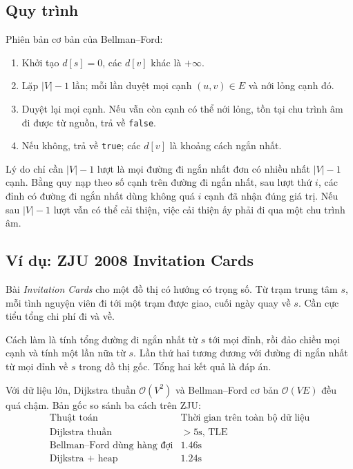 \documentclass[11pt]{article}
\newcommand{\Oh}{\mathcal{O}}
\begin{document}
\subsection{Quy trình}

Phiên bản cơ bản của Bellman--Ford:
\begin{enumerate}
  \item Khởi tạo \(d[s]=0\), các \(d[v]\) khác là \(+\infty\).
  \item Lặp \(|V|-1\) lần; mỗi lần duyệt mọi cạnh \((u,v)\in E\) và nới lỏng
  cạnh đó.
  \item Duyệt lại mọi cạnh. Nếu vẫn còn cạnh có thể nới lỏng, tồn tại chu
  trình âm đi được từ nguồn, trả về \texttt{false}.
  \item Nếu không, trả về \texttt{true}; các \(d[v]\) là khoảng cách ngắn nhất.
\end{enumerate}

Lý do chỉ cần \(|V|-1\) lượt là mọi đường đi ngắn nhất đơn có nhiều nhất
\(|V|-1\) cạnh. Bằng quy nạp theo số cạnh trên đường đi ngắn nhất, sau lượt
thứ \(i\), các đỉnh có đường đi ngắn nhất dùng không quá \(i\) cạnh đã nhận
đúng giá trị. Nếu sau \(|V|-1\) lượt vẫn có thể cải thiện, việc cải thiện ấy
phải đi qua một chu trình âm.

\subsection{Ví dụ: ZJU 2008 Invitation Cards}

Bài \textit{Invitation Cards} cho một đồ thị có hướng có trọng số. Từ trạm
trung tâm \(s\), mỗi tình nguyện viên đi tới một trạm được giao, cuối ngày
quay về \(s\). Cần cực tiểu tổng chi phí đi và về.

Cách làm là tính tổng đường đi ngắn nhất từ \(s\) tới mọi đỉnh, rồi đảo chiều
mọi cạnh và tính một lần nữa từ \(s\). Lần thứ hai tương đương với đường đi
ngắn nhất từ mọi đỉnh về \(s\) trong đồ thị gốc. Tổng hai kết quả là đáp án.

Với dữ liệu lớn, Dijkstra thuần \(\Oh(V^2)\) và Bellman--Ford cơ bản
\(\Oh(VE)\) đều quá chậm. Bản gốc so sánh ba cách trên ZJU:
\[
\begin{array}{lr}
\text{Thuật toán} & \text{Thời gian trên toàn bộ dữ liệu}\\
\hline
\text{Dijkstra thuần} & >5\text{s, TLE}\\
\text{Bellman--Ford dùng hàng đợi} & 1.46\text{s}\\
\text{Dijkstra + heap} & 1.24\text{s}
\end{array}
\]
\end{document}
